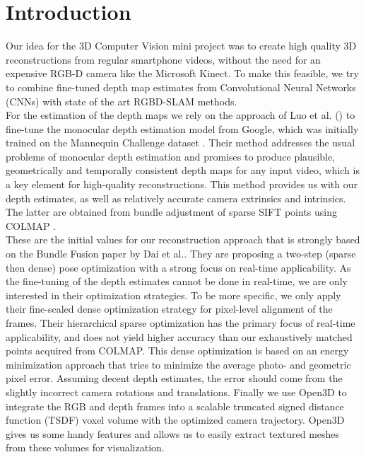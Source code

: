 \chapter{Introduction}
    Our idea for the 3D Computer Vision mini project was to create high quality 3D reconstructions from regular smartphone videos, without the need for an expensive RGB-D camera like the Microsoft Kinect.
    To make this feasible, we try to combine fine-tuned depth map estimates from Convolutional Neural Networks (CNNs) with state of the art RGBD-SLAM methods.\\
    For the estimation of the depth maps we rely on the approach of Luo et al. \cite{luo2020consistent} () to fine-tune the monocular depth estimation model from Google, which was initially trained on the Mannequin Challenge dataset \cite{mannequin}.
    Their method addresses the usual problems of monocular depth estimation and promises to produce plausible, geometrically and temporally consistent depth maps for any input video, which is a key element for high-quality reconstructions.
    This method provides us with our depth estimates, as well as relatively accurate camera extrinsics and intrinsics. The latter are obtained from bundle adjustment of sparse SIFT points using COLMAP \cite{colmap}.\\
    These are the initial values for our reconstruction approach that is strongly based on the Bundle Fusion paper \cite{dai2017bundlefusion} by Dai et al..
    They are proposing a two-step (sparse then dense) pose optimization with a strong focus on real-time applicability.
    As the fine-tuning of the depth estimates cannot be done in real-time, we are only interested in their optimization strategies.
    To be more specific, we only apply their fine-scaled dense optimization strategy for pixel-level alignment of the frames. Their hierarchical sparse optimization has the primary focus of real-time applicability, and does not yield higher accuracy than our exhaustively matched points acquired from COLMAP.
    This dense optimization is based on an energy minimization approach that tries to minimize the average photo- and geometric pixel error. Assuming decent depth estimates, the error should come from the slightly incorrect camera rotations and translations.
    Finally we use Open3D \cite{open3d} to integrate the RGB and depth frames into a scalable truncated signed distance function (TSDF) voxel volume with the optimized camera trajectory. Open3D gives us some handy features and allows us to easily extract textured meshes from these volumes for visualization.